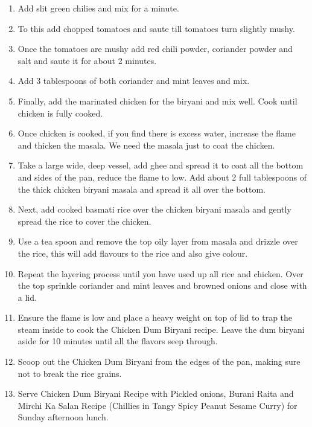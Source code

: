 \documentclass{recipe}
\begin{document}
\begin{enumerate}
            \item Add slit green chilies and mix for a minute.
            
            \item To this add chopped tomatoes and saute till tomatoes turn slightly mushy.
            
            \item Once the tomatoes are mushy add red chili powder, coriander powder and salt and saute it for about 2 minutes.
            
            \item Add 3 tablespoons of both coriander and mint leaves and mix.
            
            \item Finally, add  the marinated chicken for the biryani and mix well. Cook until chicken is fully cooked. 
            
            \item Once chicken is cooked, if you find there is excess water, increase the flame and thicken the masala. We need the masala just to coat the chicken.
            
            \item Take a large wide, deep vessel, add ghee and spread it to coat all the bottom and sides of the pan, reduce the flame to low. Add about 2 full tablespoons of the thick chicken biryani masala and spread it all over the bottom.
            
            \item Next, add cooked basmati rice over the chicken biryani masala and gently spread the rice to cover the chicken. 
            
            \item Use a tea spoon and remove the top oily layer from masala and drizzle over the rice, this will add flavours to the rice and also give colour.
            
            \item Repeat the layering process until you have used up all rice and chicken. Over the top sprinkle coriander and mint leaves and browned onions and close with a lid.
            
            \item Ensure the flame is low and place a heavy weight on top of lid to trap the steam inside to cook the Chicken Dum Biryani recipe. Leave the dum biryani aside for 10 minutes until all the flavors seep through.
            
            \item Scoop out the Chicken Dum Biryani from the edges of the pan, making sure not to break the rice grains.
            
            \item Serve Chicken Dum Biryani Recipe with Pickled onions, Burani Raita and Mirchi Ka Salan Recipe (Chillies in Tangy Spicy Peanut Sesame Curry) for Sunday afternoon lunch.
        \end{enumerate}
   
       
\end{document}
